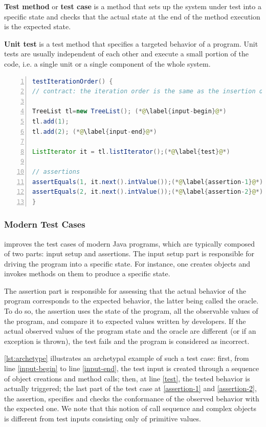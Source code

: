 \textbf{Test method} or \textbf{test case} is a method that sets up the system under test into a specific state and checks that the actual state at the end of the method execution is the expected state.

\textbf{Unit test} is a test method that specifies a targeted behavior of a program. Unit tests are usually independent of each other and execute a small portion of the code, i.e. a single unit or a single component of the whole system.


\begin{lstlisting}[caption={An example of an object-oriented test case  (inspired from Apache Commons Collections)},label=lst:archetype,float,language=java,numbers=left] 
testIterationOrder() {
// contract: the iteration order is the same as the insertion order

TreeList tl=new TreeList(); (*@\label{input-begin}@*)
tl.add(1);
tl.add(2); (*@\label{input-end}@*)

ListIterator it = tl.listIterator();(*@\label{test}@*)

// assertions
assertEquals(1, it.next().intValue());(*@\label{assertion-1}@*)
assertEquals(2, it.next().intValue());(*@\label{assertion-2}@*)
}
\end{lstlisting}

\subsubsection{Modern Test Cases}
\label{subsec:test-case-explanation}

\dspot improves the test cases of modern Java programs, which are typically composed of two parts: input setup and assertions. 
The input setup part is responsible for driving the program into a specific state.
For instance, one creates objects and invokes methods on them to produce a specific state.

The assertion part is responsible for assessing that the actual behavior of the program corresponds to the expected behavior, the latter being called the oracle.
To do so, the assertion uses the state of the program, \ie all the observable values of the program, and compare it to expected values written by developers.
If the actual observed values of the program state and the oracle are different (or if an exception is thrown), the test fails and the program is considered as incorrect.

\autoref{lst:archetype} illustrates an archetypal example of such a test case: 
first, from line \autoref{input-begin} to line \autoref{input-end}, the test input is created through a sequence of object creations and method calls; 
then, at line \autoref{test}, the tested behavior is actually triggered; 
the last part of the test case at \autoref{assertion-1} and \autoref{assertion-2}, the assertion, specifies and checks the conformance of the observed behavior with the expected one.
We note that this notion of call sequence and complex objects is different from test inputs consisting only of primitive values.

